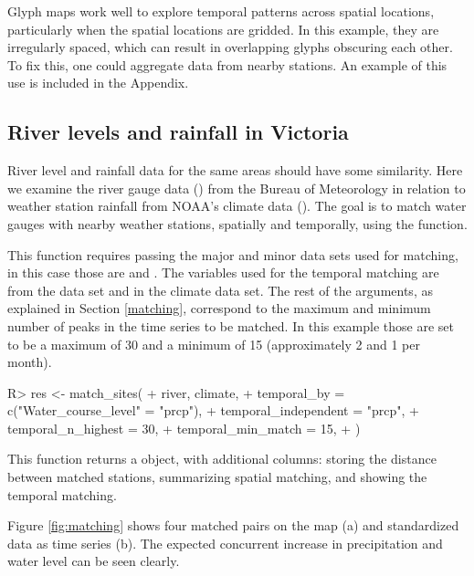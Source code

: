 \documentclass[
  shortnames]{jss}
\begin{document}
Glyph maps work well to explore temporal patterns across spatial locations, particularly when the spatial locations are gridded. In this example, they are irregularly spaced, which can result in overlapping glyphs obscuring each other. To fix this, one could aggregate data from nearby stations. An example of this use is included in the Appendix.

\hypertarget{river-levels-and-rainfall-in-victoria}{%
\subsection{River levels and rainfall in Victoria}\label{river-levels-and-rainfall-in-victoria}}

River level and rainfall data for the same areas should have some similarity. Here we examine the river gauge data () from the Bureau of Meteorology \citep{bom} in relation to weather station rainfall from NOAA's climate data (). The goal is to match water gauges with nearby weather stations, spatially and temporally, using the  function.

This function requires passing the major and minor data sets used for matching, in this case those are  and . The variables used for the temporal matching are  from the  data set and  in the climate data set. The rest of the arguments, as explained in Section \ref{matching}, correspond to the maximum and minimum number of peaks in the time series to be matched. In this example those are set to be a maximum of 30 and a minimum of 15 (approximately 2 and 1 per month).

\begin{CodeChunk}
\begin{CodeInput}
R> res <- match_sites(
+   river, climate,
+   temporal_by = c("Water_course_level" = "prcp"),
+   temporal_independent = "prcp",  
+   temporal_n_highest = 30,
+   temporal_min_match = 15, 
+ )
\end{CodeInput}
\end{CodeChunk}

This function returns a  object, with additional columns:  storing the distance between matched stations,  summarizing spatial matching, and  showing the temporal matching.

Figure \ref{fig:matching} shows four matched pairs on the map (a) and standardized data as time series (b). The expected concurrent increase in precipitation and water level can be seen clearly.
\end{document}

